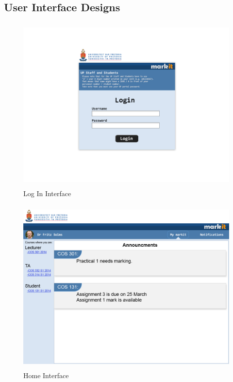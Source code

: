 \documentclass[12pt]{article}
\begin{document}
		\subsection{User Interface Designs} %
						\begin{figure}[h]
										\centering
										\includegraphics[width=5in, height=3.5in]{Pictures/Screens/Desktop/01logon.jpg}
										\caption{Log In Interface}
						\end{figure}
						\FloatBarrier
						
						\begin{figure}[h]
										\centering
										\includegraphics[width=5in, height=3.5in]{Pictures/Screens/Desktop/02homePage.jpg}
										\caption{Home Interface}
						\end{figure}
						\FloatBarrier
						
\end{document}
